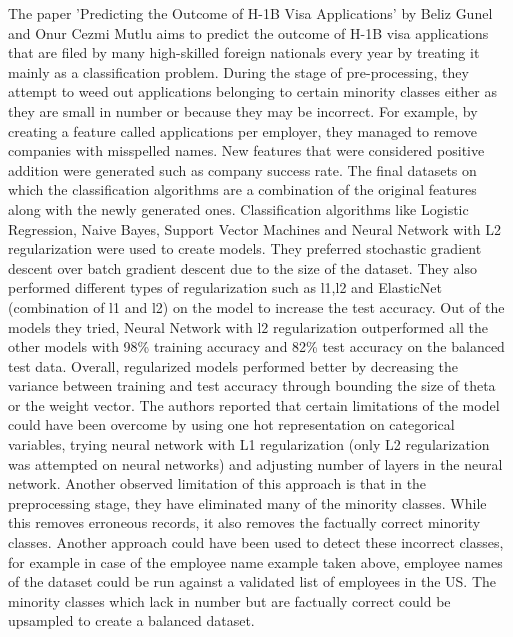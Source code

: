 \documentclass[conference]{IEEEtran}
\begin{document}
The paper 'Predicting the Outcome of H-1B Visa Applications' by Beliz Gunel and Onur Cezmi Mutlu aims to predict the outcome of H-1B visa applications that are filed by many high-skilled foreign nationals every year by treating it mainly as a classification problem. During the stage of pre-processing, they attempt to weed out applications belonging to certain minority classes either as they are small in number or because they may be incorrect. For example, by creating a feature called applications per employer, they managed to remove companies with misspelled names. New features that were considered positive addition were generated such as company success rate. The final datasets on which the classification algorithms are a combination of the original features along with the newly generated ones. Classification algorithms like Logistic Regression, Naive Bayes, Support Vector Machines and Neural Network with L2 regularization were used to create models. They preferred stochastic gradient descent over batch gradient descent due to the size of the dataset. They also performed different types of regularization such as l1,l2 and ElasticNet (combination of l1 and l2) on the model to increase the test accuracy. Out of the models they tried, Neural Network with l2 regularization outperformed all the other models with 98\% training accuracy and 82\% test accuracy on the balanced test data. Overall, regularized models performed better by decreasing the variance between training and test accuracy through bounding the size of theta or the weight vector. The authors reported that certain limitations of the model could have been overcome by using one hot representation on categorical variables, trying neural network with L1 regularization (only L2 regularization was attempted on neural networks) and adjusting number of layers in the neural network. Another observed limitation of this approach is that in the preprocessing stage, they have eliminated many of the minority classes. While this removes erroneous records, it also removes the factually correct minority classes. Another approach could have been used to detect these incorrect classes, for example in case of the employee name example taken above, employee names of the dataset could be run against a validated list of employees in the US. The minority classes which lack in number but are factually correct could be upsampled to create a balanced dataset.
\end{document}
